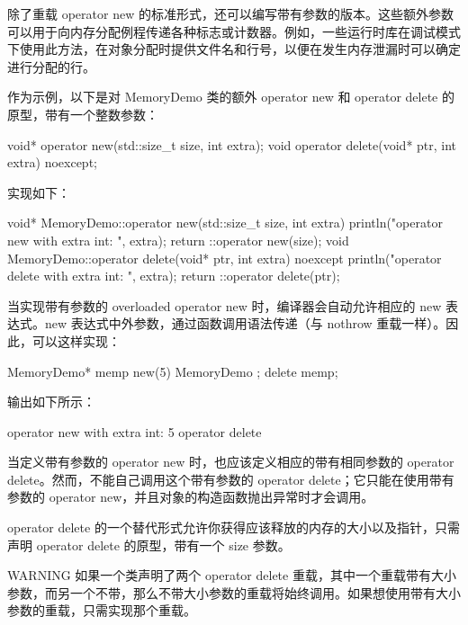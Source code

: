 
除了重载 operator new 的标准形式，还可以编写带有参数的版本。这些额外参数可以用于向内存分配例程传递各种标志或计数器。例如，一些运行时库在调试模式下使用此方法，在对象分配时提供文件名和行号，以便在发生内存泄漏时可以确定进行分配的行。

作为示例，以下是对 MemoryDemo 类的额外 operator new 和 operator delete 的原型，带有一个整数参数：

\begin{cpp}
void* operator new(std::size_t size, int extra);
void operator delete(void* ptr, int extra) noexcept;
\end{cpp}

实现如下：

\begin{cpp}
void* MemoryDemo::operator new(std::size_t size, int extra)
{
    println("operator new with extra int: {}", extra);
    return ::operator new(size);
}
void MemoryDemo::operator delete(void* ptr, int extra) noexcept
{
    println("operator delete with extra int: {}", extra);
    return ::operator delete(ptr);
}
\end{cpp}

当实现带有参数的 overloaded operator new 时，编译器会自动允许相应的 new 表达式。new 表达式中外参数，通过函数调用语法传递（与 nothrow 重载一样）。因此，可以这样实现：

\begin{cpp}
MemoryDemo* memp { new(5) MemoryDemo{} };
delete memp;
\end{cpp}

输出如下所示：

\begin{shell}
operator new with extra int: 5
operator delete
\end{shell}

当定义带有参数的 operator new 时，也应该定义相应的带有相同参数的 operator delete。然而，不能自己调用这个带有参数的 operator delete；它只能在使用带有参数的 operator new，并且对象的构造函数抛出异常时才会调用。


operator delete 的一个替代形式允许你获得应该释放的内存的大小以及指针，只需声明 operator delete 的原型，带有一个 size 参数。

\begin{myWarning}{WARNING}
如果一个类声明了两个 operator delete 重载，其中一个重载带有大小参数，而另一个不带，那么不带大小参数的重载将始终调用。如果想使用带有大小参数的重载，只需实现那个重载。
\end{myWarning}

